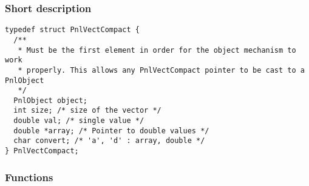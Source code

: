 \subsubsection{Short description}

\begin{verbatim}
typedef struct PnlVectCompact {
  /**
   * Must be the first element in order for the object mechanism to work
   * properly. This allows any PnlVectCompact pointer to be cast to a PnlObject
   */
  PnlObject object; 
  int size; /* size of the vector */
  double val; /* single value */
  double *array; /* Pointer to double values */
  char convert; /* 'a', 'd' : array, double */
} PnlVectCompact;
\end{verbatim}

\subsubsection{Functions}

